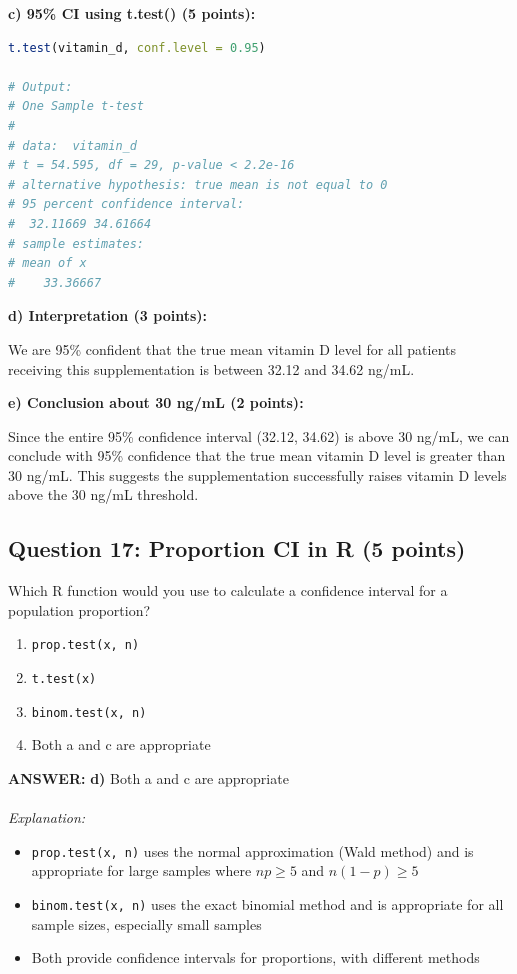 \documentclass[11pt]{article}
\newcommand{\answer}[1]{\par\vspace{0.3em}\colorbox{green!10}{\parbox{\dimexpr\textwidth-2\fboxsep}{\textbf{ANSWER:} #1}}\vspace{0.3em}\par}
\begin{document}
\textbf{c) 95\% CI using t.test() (5 points):}
\begin{lstlisting}[language=R, basicstyle=\small\ttfamily]
t.test(vitamin_d, conf.level = 0.95)

# Output:
# One Sample t-test
#
# data:  vitamin_d
# t = 54.595, df = 29, p-value < 2.2e-16
# alternative hypothesis: true mean is not equal to 0
# 95 percent confidence interval:
#  32.11669 34.61664
# sample estimates:
# mean of x
#    33.36667
\end{lstlisting}

\textbf{d) Interpretation (3 points):}

We are 95\% confident that the true mean vitamin D level for all patients receiving this supplementation is between 32.12 and 34.62 ng/mL.

\textbf{e) Conclusion about 30 ng/mL (2 points):}

Since the entire 95\% confidence interval (32.12, 34.62) is above 30 ng/mL, we can conclude with 95\% confidence that the true mean vitamin D level is greater than 30 ng/mL. This suggests the supplementation successfully raises vitamin D levels above the 30 ng/mL threshold.

\subsection*{Question 17: Proportion CI in R (5 points)}

Which R function would you use to calculate a confidence interval for a population proportion?

\begin{enumerate}[label=\alph*)]
\item \texttt{prop.test(x, n)}
\item \texttt{t.test(x)}
\item \texttt{binom.test(x, n)}
\item Both a and c are appropriate
\end{enumerate}

\answer{\textbf{d)} Both a and c are appropriate \\ \\
\textit{Explanation:}
\begin{itemize}
\item \texttt{prop.test(x, n)} uses the normal approximation (Wald method) and is appropriate for large samples where $np \geq 5$ and $n(1-p) \geq 5$
\item \texttt{binom.test(x, n)} uses the exact binomial method and is appropriate for all sample sizes, especially small samples
\item Both provide confidence intervals for proportions, with different methods
\end{itemize}}
\end{document}
